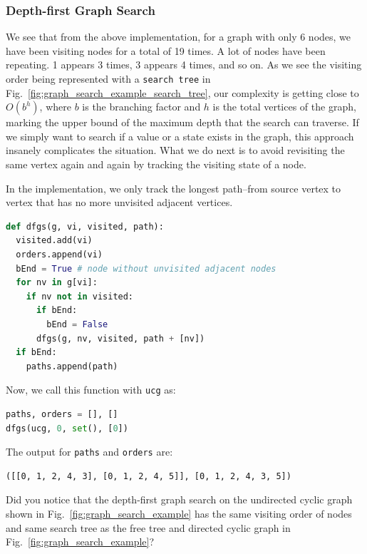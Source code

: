 \documentclass[../main.tex]{subfiles}
\begin{document}
\subsubsection{Depth-first Graph Search}
 We see that from the above implementation, for a graph with only 6 nodes, we have been visiting nodes for a total of 19 times. 
 A lot of nodes have been repeating. 1 appears 3 times, 3 appears 4 times, and so on. As we see the visiting order being represented with a \texttt{search tree} in Fig.~\ref{fig:graph_search_example_search_tree}, our complexity is getting close to $O(b^h)$, where $b$ is the branching factor and $h$ is the total vertices of the graph, marking the upper bound of the maximum depth that the search can traverse. 
 If we simply want to search if a value or a state exists in the graph, this approach insanely complicates the situation. 
 What we do next is to avoid revisiting the same vertex again and again by tracking the visiting state of a node. 
 
 In the implementation, we only track the longest path--from source vertex to vertex that has no more unvisited adjacent vertices. 
\begin{lstlisting}[language=Python]
def dfgs(g, vi, visited, path):
  visited.add(vi)
  orders.append(vi)
  bEnd = True # node without unvisited adjacent nodes    
  for nv in g[vi]:  
    if nv not in visited: 
      if bEnd:
        bEnd = False
      dfgs(g, nv, visited, path + [nv])
  if bEnd:
    paths.append(path)
\end{lstlisting}
Now, we call this function with \texttt{ucg} as:
\begin{lstlisting}[language=Python]
paths, orders = [], []
dfgs(ucg, 0, set(), [0])
\end{lstlisting}
The output for \texttt{paths} and \texttt{orders} are:
\begin{lstlisting}[numbers=none]
([[0, 1, 2, 4, 3], [0, 1, 2, 4, 5]], [0, 1, 2, 4, 3, 5])
\end{lstlisting}
Did you notice that the depth-first graph search on the undirected cyclic graph shown in Fig.~\ref{fig:graph_search_example} has the same visiting order of nodes and same search tree as the free tree and directed cyclic graph in Fig.~\ref{fig:graph_search_example}?
\end{document}
